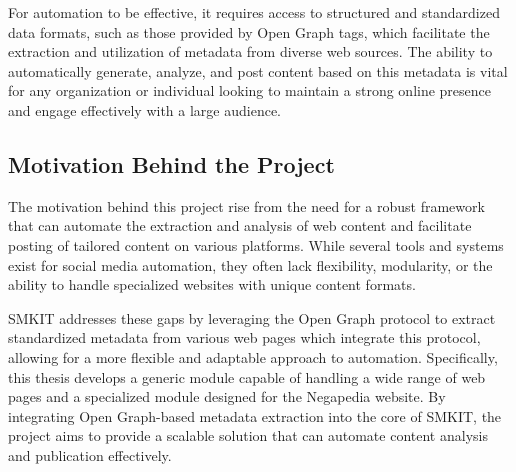 For automation to be effective, it requires access to structured and standardized data formats, such as those provided by Open Graph tags, which facilitate the extraction and utilization of metadata from diverse web sources. The ability to automatically generate, analyze, and post content based on this metadata is vital for any organization or individual looking to maintain a strong online presence and engage effectively with a large audience.

\subsection{Motivation Behind the Project}
\label{sec:motivation_behind_the_project}
The motivation behind this project rise from the need for a robust framework that can automate the extraction and analysis of web content and facilitate posting of tailored content on various platforms. While several tools and systems exist for social media automation, they often lack flexibility, modularity, or the ability to handle specialized websites with unique content formats.

SMKIT addresses these gaps by leveraging the Open Graph protocol to extract standardized metadata from various web pages which integrate this protocol, allowing for a more flexible and adaptable approach to automation. Specifically, this thesis develops a generic module capable of handling a wide range of web pages and a specialized module designed for the Negapedia website. By integrating Open Graph-based metadata extraction into the core of SMKIT, the project aims to provide a scalable solution that can automate content analysis and publication effectively.


